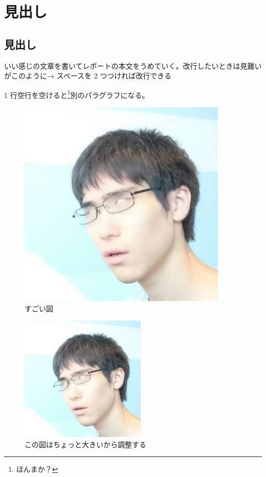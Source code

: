 \hypertarget{ux898bux51faux3057}{%
\section{見出し}\label{ux898bux51faux3057}}

\hypertarget{ux898bux51faux3057-1}{%
\subsection{見出し}\label{ux898bux51faux3057-1}}

いい感じの文章を書いてレポートの本文をうめていく。改行したいときは見難いがこのように→
スペースを 2 つつければ改行できる

1 行空行を空けると\footnote{ほんまか？}別のパラグラフになる。

\begin{figure}
\hypertarget{fig:sugoi}{%
\centering
\includegraphics[width=100mm]{sample.png}
\caption[すごい図]{すごい図\footnotemark{}}\label{fig:sugoi}
}
\end{figure}

\begin{figure}
\hypertarget{fig:sugoi-large}{%
\centering
\includegraphics[width=\textwidth,height=60mm]{sample.png}
\caption{この図はちょっと大きいから調整する}\label{fig:sugoi-large}
}
\end{figure}

